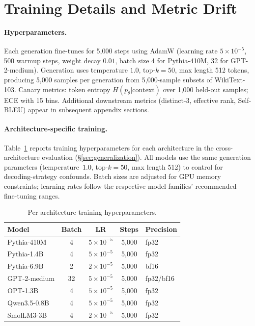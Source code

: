 \appendix

\section{Training Details and Metric Drift}
\label{app:training_details}
\label{app:drift}

\paragraph{Hyperparameters.}
Each generation fine-tunes for 5{,}000 steps using AdamW (learning rate $5 \times 10^{-5}$, 500 warmup steps, weight decay $0.01$, batch size 4 for Pythia-410M, 32 for GPT-2-medium).
Generation uses temperature $1.0$, top-$k{=}50$, max length 512 tokens, producing 5{,}000 samples per generation from 5{,}000-sample subsets of WikiText-103.
Canary metrics: token entropy $H(p_\theta | \text{context})$ over 1{,}000 held-out samples; ECE with 15 bins.
Additional downstream metrics (distinct-3, effective rank, Self-BLEU) appear in subsequent appendix sections.

\paragraph{Architecture-specific training.}
Table~\ref{tab:arch_hyperparams} reports training hyperparameters for each architecture in the cross-architecture evaluation (\S\ref{sec:generalization}).
All models use the same generation parameters (temperature~$1.0$, top-$k{=}50$, max length 512) to control for decoding-strategy confounds.
Batch sizes are adjusted for GPU memory constraints; learning rates follow the respective model families' recommended fine-tuning ranges.

\begin{table}[t]
\centering
\small
\caption{Per-architecture training hyperparameters.}
\label{tab:arch_hyperparams}
\begin{tabular}{lcccl}
\toprule
Model & Batch & LR & Steps & Precision \\
\midrule
Pythia-410M & 4 & $5{\times}10^{-5}$ & 5{,}000 & fp32 \\
Pythia-1.4B & 4 & $5{\times}10^{-5}$ & 5{,}000 & fp32 \\
Pythia-6.9B & 2 & $2{\times}10^{-5}$ & 5{,}000 & bf16 \\
GPT-2-medium & 32 & $5{\times}10^{-5}$ & 5{,}000 & fp32/bf16 \\
OPT-1.3B & 4 & $5{\times}10^{-5}$ & 5{,}000 & fp32 \\
Qwen3.5-0.8B & 4 & $5{\times}10^{-5}$ & 5{,}000 & fp32 \\
SmolLM3-3B & 4 & $2{\times}10^{-5}$ & 5{,}000 & fp32 \\
\bottomrule
\end{tabular}
\end{table}

